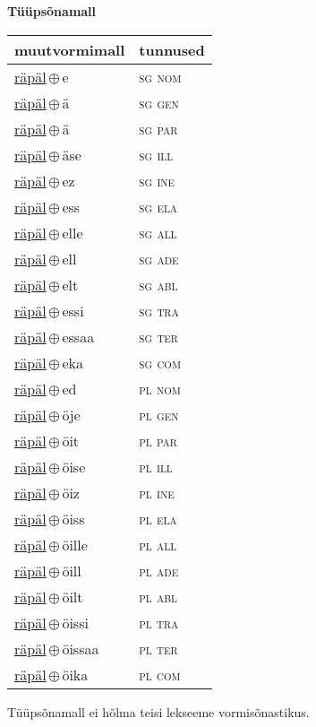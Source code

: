 

\vspace{3.5em}
\noindent \begin{minipage}{\textwidth}
\noindent \textbf{Tüüpsõnamall \,}\\

\begin{sideways}
\begin{tabular}{l l}
muutvormimall & tunnused \\
\hline
\underline{räpäl}\,$\oplus$\,e & \textsc{ sg nom } \\
\underline{räpäl}\,$\oplus$\,ä & \textsc{ sg gen } \\
\underline{räpäl}\,$\oplus$\,ä & \textsc{ sg par } \\
\underline{räpäl}\,$\oplus$\,äse & \textsc{ sg ill } \\
\underline{räpäl}\,$\oplus$\,ez & \textsc{ sg ine } \\
\underline{räpäl}\,$\oplus$\,ess & \textsc{ sg ela } \\
\underline{räpäl}\,$\oplus$\,elle & \textsc{ sg all } \\
\underline{räpäl}\,$\oplus$\,ell & \textsc{ sg ade } \\
\underline{räpäl}\,$\oplus$\,elt & \textsc{ sg abl } \\
\underline{räpäl}\,$\oplus$\,essi & \textsc{ sg tra } \\
\underline{räpäl}\,$\oplus$\,essaa & \textsc{ sg ter } \\
\underline{räpäl}\,$\oplus$\,eka & \textsc{ sg com } \\
\underline{räpäl}\,$\oplus$\,ed & \textsc{ pl nom } \\
\underline{räpäl}\,$\oplus$\,öje & \textsc{ pl gen } \\
\underline{räpäl}\,$\oplus$\,öit & \textsc{ pl par } \\
\underline{räpäl}\,$\oplus$\,öise & \textsc{ pl ill } \\
\underline{räpäl}\,$\oplus$\,öiz & \textsc{ pl ine } \\
\underline{räpäl}\,$\oplus$\,öiss & \textsc{ pl ela } \\
\underline{räpäl}\,$\oplus$\,öille & \textsc{ pl all } \\
\underline{räpäl}\,$\oplus$\,öill & \textsc{ pl ade } \\
\underline{räpäl}\,$\oplus$\,öilt & \textsc{ pl abl } \\
\underline{räpäl}\,$\oplus$\,öissi & \textsc{ pl tra } \\
\underline{räpäl}\,$\oplus$\,öissaa & \textsc{ pl ter } \\
\underline{räpäl}\,$\oplus$\,öika & \textsc{ pl com } \\
\end{tabular}
\end{sideways}
\label{tab:tüüpsõnamall-räpäle}

\end{minipage}

 
\vspace{1em}
\noindent Tüüpsõnamall  ei hõlma teisi lekseeme vormi\-sõnastikus.
